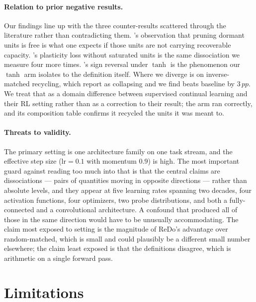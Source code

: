 \documentclass[10pt]{article}
\newcommand{\pp}{\,pp}
\begin{document}
\paragraph{Relation to prior negative results.} Our findings line up with the
three counter-results scattered through the literature rather than contradicting
them. \citeauthor{sokar2023dormant}'s observation that pruning dormant units is
free is what one expects if those units are not carrying recoverable capacity.
\citeauthor{lyle2023understanding}'s plasticity loss without saturated units is
the same dissociation we measure four more times.
\citeauthor{kooi2024hadamard}'s sign reversal under $\tanh$ is the phenomenon our
$\tanh$ arm isolates to the definition itself. Where we diverge is on
inverse-matched recycling, which \citeauthor{sokar2023dormant} report as
collapsing and we find beats baseline by $3\pp$. We treat that as a domain
difference between supervised continual learning and their RL setting rather
than as a correction to their result; the arm ran correctly, and its composition
table confirms it recycled the units it was meant to.

\paragraph{Threats to validity.} The primary setting is one architecture family
on one task stream, and the effective step size ($\text{lr}=0.1$ with momentum
$0.9$) is high. The most important guard against reading too much into that is
that the central claims are dissociations --- pairs of quantities moving in
opposite directions --- rather than absolute levels, and they appear at five
learning rates spanning two decades, four activation functions, four optimizers,
two probe distributions, and both a fully-connected and a convolutional
architecture. A confound that produced all of those in the same direction would
have to be unusually accommodating. The claim most exposed to setting is the
magnitude of ReDo's advantage over random-matched, which is small and could
plausibly be a different small number elsewhere; the claim least exposed is that
the definitions disagree, which is arithmetic on a single forward pass.

\section{Limitations}
\label{sec:limitations}
\end{document}
